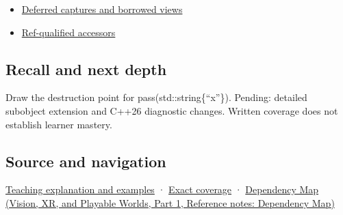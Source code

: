 \hypertarget{appendix-a978b29bbbb0-used-by}{}

\begin{itemize}
\tightlist
\item
  \hyperref[appendix-aea529eb5175]{Deferred captures and borrowed views}
\item
  \hyperref[appendix-d42039b1d6f7]{Ref-qualified accessors}
\end{itemize}

\subsection{Recall and next depth}\label{appendix-a978b29bbbb0-recall-and-next-depth}

\hypertarget{appendix-a978b29bbbb0-recall-and-next-depth}{}

Draw the destruction point for pass(std::string\{``x''\}). Pending: detailed subobject extension and C++26 diagnostic changes. Written coverage does not establish learner mastery.

\subsection{Source and navigation}\label{appendix-a978b29bbbb0-source-and-navigation}

\hypertarget{appendix-a978b29bbbb0-source-and-navigation}{}

\hyperref[01-foundations-i-ch003-a-temporary-needs-an-explicit-lifetime-story]{Teaching explanation and examples} · \hyperref[appendix-fd090d982a15-m008---parts-113-126]{Exact coverage} · \href{../07-Vision-XR-and-Playable-Worlds-P01/main.pdf\#appendix-4ad47bdd269a}{Dependency Map (Vision, XR, and Playable Worlds, Part 1, Reference notes: Dependency Map)}
